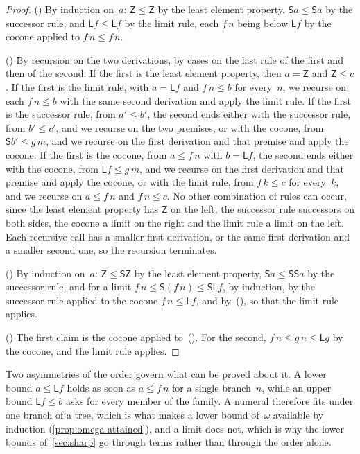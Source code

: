 \documentclass[11pt]{amsart}
\newcommand{\bZ}{\mathsf{Z}}
\newcommand{\bS}{\mathsf{S}}
\newcommand{\bL}{\mathsf{L}}
\theoremstyle{plain}
\theoremstyle{definition}
\begin{document}
\begin{proof}
() By induction on~$a$: $\bZ \le \bZ$ by the least
element property, $\bS a \le \bS a$ by the successor rule, and
$\bL f \le \bL f$ by the limit rule, each $f\,n$ being below $\bL f$ by
the cocone applied to $f\,n \le f\,n$.

() By recursion on the two derivations, by cases
on the last rule of the first and then of the second. If the first is
the least element property, then $a = \bZ$ and $\bZ \le c$. If the
first is the limit rule, with $a = \bL f$ and $f\,n \le b$ for
every~$n$, we recurse on each $f\,n \le b$ with the same second
derivation and apply the limit rule. If the first is the successor
rule, from $a' \le b'$, the second ends either with the successor rule,
from $b' \le c'$, and we recurse on the two premises, or with the
cocone, from $\bS b' \le g\,m$, and we recurse on the first derivation
and that premise and apply the cocone. If the first is the cocone, from
$a \le f\,n$ with $b = \bL f$, the second ends either with the cocone,
from $\bL f \le g\,m$, and we recurse on the first derivation and that
premise and apply the cocone, or with the limit rule, from
$f\,k \le c$ for every~$k$, and we recurse on $a \le f\,n$ and
$f\,n \le c$. No other combination of rules can occur, since the least
element property has $\bZ$ on the left, the successor rule successors
on both sides, the cocone a limit on the right and the limit rule a
limit on the left. Each recursive call has a smaller first derivation,
or the same first derivation and a smaller second one, so the recursion
terminates.

() By induction on~$a$: $\bZ \le \bS\bZ$ by the
least element property, $\bS a \le \bS\bS a$ by the successor rule,
and for a limit $f\,n \le \bS(f\,n) \le \bS\bL f$, by induction, by
the successor rule applied to the cocone $f\,n \le \bL f$, and
by~(), so that the limit rule applies.

() The first claim is the cocone applied
to~(). For the second, $f\,n \le g\,n \le \bL g$
by the cocone, and the limit rule applies.
\end{proof}

\begin{remark}
\label{rem:one-branch}
Two asymmetries of the order govern what can be proved about it. A
lower bound $a \le \bL f$ holds as soon as $a \le f\,n$ for a single
branch~$n$, while an upper bound $\bL f \le b$ asks for every member of
the family. A numeral therefore fits under one branch of a tree, which
is what makes a lower bound of~$\omega$ available by induction
(\cref{prop:omega-attained}), and a limit does not, which is why the
lower bounds of~\cref{sec:sharp} go through terms rather than through
the order alone.
\end{remark}
\end{document}
